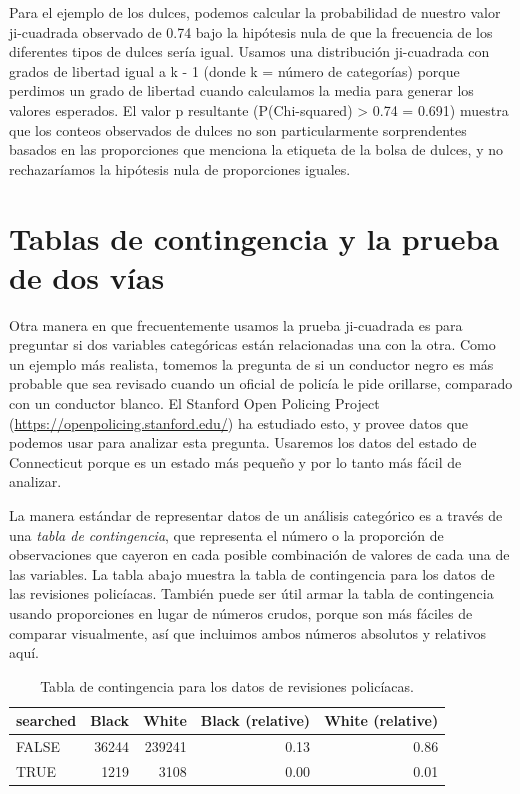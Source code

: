 \documentclass[
  12pt,
]{book}
\begin{document}
Para el ejemplo de los dulces, podemos calcular la probabilidad de nuestro valor ji-cuadrada observado de 0.74 bajo la hipótesis nula de que la frecuencia de los diferentes tipos de dulces sería igual. Usamos una distribución ji-cuadrada con grados de libertad igual a k - 1 (donde k = número de categorías) porque perdimos un grado de libertad cuando calculamos la media para generar los valores esperados. El valor p resultante (P(Chi-squared) \textgreater{} 0.74 = 0.691) muestra que los conteos observados de dulces no son particularmente sorprendentes basados en las proporciones que menciona la etiqueta de la bolsa de dulces, y no rechazaríamos la hipótesis nula de proporciones iguales.

\hypertarget{two-way-test}{%
\section{Tablas de contingencia y la prueba de dos vías}\label{two-way-test}}

Otra manera en que frecuentemente usamos la prueba ji-cuadrada es para preguntar si dos variables categóricas están relacionadas una con la otra. Como un ejemplo más realista, tomemos la pregunta de si un conductor negro es más probable que sea revisado cuando un oficial de policía le pide orillarse, comparado con un conductor blanco. El Stanford Open Policing Project (\url{https://openpolicing.stanford.edu/}) ha estudiado esto, y provee datos que podemos usar para analizar esta pregunta. Usaremos los datos del estado de Connecticut porque es un estado más pequeño y por lo tanto más fácil de analizar.

La manera estándar de representar datos de un análisis categórico es a través de una \emph{tabla de contingencia}, que representa el número o la proporción de observaciones que cayeron en cada posible combinación de valores de cada una de las variables. La tabla abajo muestra la tabla de contingencia para los datos de las revisiones policíacas. También puede ser útil armar la tabla de contingencia usando proporciones en lugar de números crudos, porque son más fáciles de comparar visualmente, así que incluimos ambos números absolutos y relativos aquí.

\begin{table}

\caption{\label{tab:unnamed-chunk-79}Tabla de contingencia para los datos de revisiones policíacas.}
\centering
\begin{tabular}[t]{l|r|r|r|r}
\hline
searched & Black & White & Black (relative) & White (relative)\\
\hline
FALSE & 36244 & 239241 & 0.13 & 0.86\\
\hline
TRUE & 1219 & 3108 & 0.00 & 0.01\\
\hline
\end{tabular}
\end{table}
\end{document}
